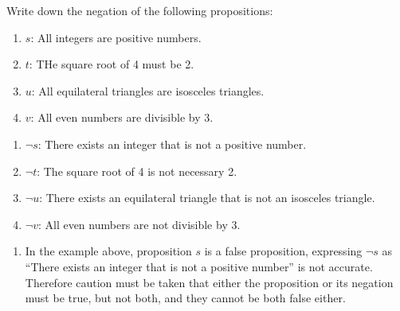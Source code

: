 \documentclass{report}
\newcounter{example}
\begin{document}
\vspace{0.5cm}
\begin{example}
    \item Write down the negation of the following propositions:
    \begin{enumerate}[label=, leftmargin=*]
        \item $s$: All integers are positive numbers.
        \item $t$: THe square root of 4 must be 2.
        \item $u$: All equilateral triangles are isosceles triangles.
        \item $v$: All even numbers are divisible by 3.
    \end{enumerate}
\end{example}
\begin{solution}
    \item \begin{enumerate}[label=, leftmargin=*]
        \item $\neg s$: There exists an integer that is not a positive number.
        \item $\neg t$: The square root of 4 is not necessary 2.
        \item $\neg u$: There exists an equilateral triangle that is not an isosceles triangle.
        \item $\neg v$: All even numbers are not divisible by 3.
    \end{enumerate}
\end{solution}

\begin{enumerate}[label=\textbf{NOTE: }, leftmargin=*]
    \item In the example above, proposition $s$ is a false proposition, expressing $\neg
              s$ as ``There exists an integer that is not a positive number'' is not
          accurate. Therefore caution must be taken that either the proposition or its
          negation must be true, but not both, and they cannot be both false either.
\end{enumerate}
\end{document}

